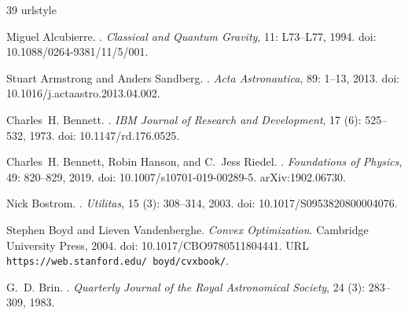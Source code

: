 \documentclass[11pt,a4paper]{article}
\theoremstyle{definition}\newtheorem{definition}{Definition}
\begin{document}


\begin{thebibliography}{39}
\providecommand{\natexlab}[1]{#1}
\providecommand{\url}[1]{\texttt{#1}}
\expandafter\ifx\csname urlstyle\endcsname\relax
  \providecommand{\doi}[1]{doi: #1}\else
  \providecommand{\doi}{doi: \begingroup \urlstyle{rm}\Url}\fi

Miguel Alcubierre.
.
\newblock \emph{Classical and Quantum Gravity}, 11: L73--L77, 1994.
\newblock \doi{10.1088/0264-9381/11/5/001}.

Stuart Armstrong and Anders Sandberg.
.
\newblock \emph{Acta Astronautica}, 89: 1--13, 2013.
\newblock \doi{10.1016/j.actaastro.2013.04.002}.

Charles~H. Bennett.
.
\newblock \emph{IBM Journal of Research and Development}, 17
  (6): 525--532, 1973.
\newblock \doi{10.1147/rd.176.0525}.

Charles~H. Bennett, Robin Hanson, and C.~Jess Riedel.
.
\newblock \emph{Foundations of Physics}, 49: 820--829, 2019.
\newblock \doi{10.1007/s10701-019-00289-5}.
\newblock arXiv:1902.06730.

Nick Bostrom.
.
\newblock \emph{Utilitas}, 15 (3): 308--314, 2003.
\newblock \doi{10.1017/S0953820800004076}.

Stephen Boyd and Lieven Vandenberghe.
\newblock \emph{{Convex Optimization}}.
\newblock Cambridge University Press, 2004.
\newblock \doi{10.1017/CBO9780511804441}.
\newblock URL \url{https://web.stanford.edu/~boyd/cvxbook/}.

G.~D. Brin.
.
\newblock \emph{Quarterly Journal of the Royal Astronomical Society},
  24 (3): 283--309, 1983.


\end{thebibliography}
\end{document}
